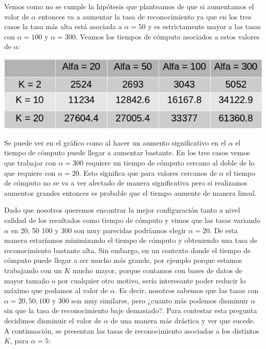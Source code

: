 Vemos como no se cumple la hipótesis que planteamos de que si aumentamos el valor de $\alpha$ entonces va a aumentar la tasa de reconocimiento ya que en los tres casos la tasa más alta está asociada a $\alpha = 50$ y es estrictamente mayor a las tasas con $\alpha = 100$ y $\alpha = 300$.
\newline Veamos los tiempos de cómputo asociados a estos valores de $\alpha$:
\newline
\newline
\centerline{
\includegraphics[scale=0.4]{Tablas/variandoalfatc.jpg}
}
\newline
\newline
Se puede ver en el gráfico como al hacer un aumento significativo en el $\alpha$ el tiempo de cómputo puede llegar a aumentar bastante. En los tres casos vemos que trabajar con $\alpha = 300$ requiere un tiempo de cómputo cercano al doble de lo que requiere con $\alpha = 20$. Esto significa que para valores cercanos de $\alpha$ el tiempo de cómputo no se va a ver afectado de manera significativa pero si realizamos aumentos grandes entonces es probable que el tiempo aumente de manera lineal.
\par Dado que nosotros queremos encontrar la mejor configuración tanto a nivel calidad de los resultados como tiempo de cómputo y vimos que las tasas variando $\alpha$ en 20, 50 100 y 300 son muy parecidas podríamos elegir $\alpha = 20$. De esta manera estaríamos minimizando el tiempo de cómputo y obteniendo una tasa de reconocimiento bastante alta. Sin embargo, en un contexto donde el tiempo de cómputo puede llegar a ser mucho más grande, por ejemplo porque estamos trabajando con un $K$ mucho mayor, porque contamos con bases de datos de mayor tamaño o por cualquier otro motivo, sería interesante poder reducir lo máximo que podamos al valor de $\alpha$. Es decir, nosotros sabemos que las tasas con $\alpha = 20, 50, 100$ y $300$ son muy similares, pero ¿cuanto más podemos disminuir $\alpha$ sin que la tasa de reconocimiento baje demasiado?. Para contestar esta pregunta decidimos disminuir el valor de $\alpha$ de una manera más drástica y ver que sucede. A continuación, se presentan las tasas de reconocimiento asociadas a los distintos $K$, para $\alpha = 5$:
